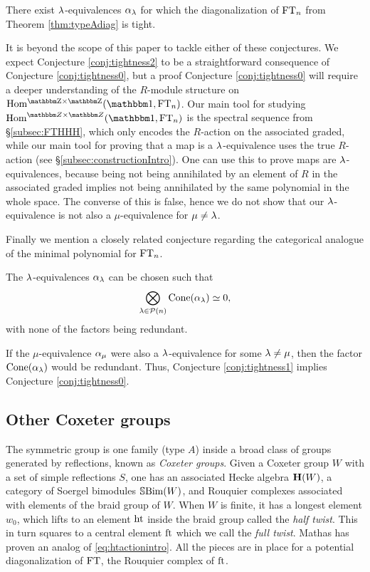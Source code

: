 \begin{conjecture}\label{conj:tightness2}
There exist $\lambda$-equivalences $\alpha_\lambda$ for which the diagonalization of $\operatorname{FT}_n$ from Theorem \ref{thm:typeAdiag} is tight.
\end{conjecture}

It is beyond the scope of this paper to tackle either of these conjectures.  We expect Conjecture \ref{conj:tightness2} to be a straightforward consequence of Conjecture \ref{conj:tightness0}, but a proof Conjecture \ref{conj:tightness0} will require a deeper understanding of the $R$-module structure on $\Homgg(\one,\FT_n)$.  Our main tool for studying $\Hom^{\Z \times \Z}(\one,\FT_n)$ is the spectral sequence from \S\ref{subsec:FTHHH}, which only encodes the $R$-action on the associated graded, while our main tool for proving that a map is a $\lambda$-equivalence uses the true $R$-action (see \S\ref{subsec:constructionIntro}).  One can use this to prove maps are $\lambda$-equivalences, because being not being annihilated by an element of $R$ in the associated graded implies not being annihilated by the same polynomial in the whole space.  The converse of this is false, hence we do not show that our $\lambda$-equivalence is not also a $\mu$-equivalence for $\mu\neq \lambda$.

Finally we mention a closely related conjecture regarding the categorical analogue of the minimal polynomial for $\operatorname{FT}_n$.

\begin{conjecture}\label{conj:tightness1}
The $\lambda$-equivalences $\alpha_\lambda$ can be chosen such that
\begin{equation} \bigotimes_{\lambda\in {\mathcal{P}}(n)} \operatorname{Cone}(\alpha_\lambda) \simeq 0, \end{equation}
with none of the factors being redundant.
\end{conjecture}
If the $\mu$-equivalence $\alpha_\mu$ were also a $\lambda$-equivalence for some $\lambda\neq \mu$, then the factor $\operatorname{Cone}(\alpha_\lambda)$ would be redundant.  Thus, Conjecture \ref{conj:tightness1} implies Conjecture \ref{conj:tightness0}.


\subsection{Other Coxeter groups}

The symmetric group is one family (type $A$) inside a broad class of groups generated by reflections, known as \emph{Coxeter groups}. Given a Coxeter group $W$ with a set of simple
reflections $S$, one has an associated Hecke algebra ${\mathbf H}(W)$, a category of Soergel bimodules ${\mathbb{S}}{\rm Bim }(W)$, and Rouquier complexes associated with elements of the braid group of $W$. When
$W$ is finite, it has a longest element $w_0$, which lifts to an element $\operatorname{ht}$ inside the braid group called the \emph{half twist}. This in turn squares to a central element $\operatorname{ft}$ which
we call the \emph{full twist}. Mathas \cite{Mathas96} has proven an analog of \eqref{eq:htactionintro}. All the pieces are in place for a potential diagonalization of $\operatorname{FT}$, the Rouquier
complex of $\operatorname{ft}$.

